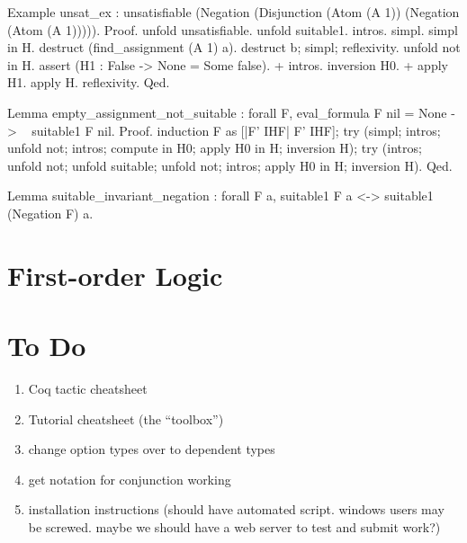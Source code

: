\documentclass{article}
\begin{document}
Example unsat_ex : unsatisfiable (Negation (Disjunction (Atom (A 1)) (Negation (Atom (A 1))))).
Proof.
  unfold unsatisfiable.
  unfold suitable1.
  intros.
  simpl. simpl in H.
  destruct (find_assignment (A 1) a).
  destruct b; simpl; reflexivity.
  unfold not in H.
  assert (H1 : False -> None = Some false).
  + intros. inversion H0.
  + apply H1. apply H. reflexivity.
Qed.

Lemma empty_assignment_not_suitable : forall F,
                                        eval_formula F nil = None -> ~ suitable1 F nil.
Proof.
  induction F as [|F' IHF| F' IHF];
  try (simpl; intros; unfold not; intros; compute in H0; apply H0 in H; inversion H);
  try (intros; unfold not; unfold suitable; unfold not; intros; apply H0 in H; inversion H).
Qed.

Lemma  suitable_invariant_negation : forall F a,                                                                                                                                                            
                                       suitable1 F a <-> suitable1 (Negation F) a.


\section{First-order Logic}





\section{To Do}
\begin{enumerate}
\item Coq tactic cheatsheet
\item Tutorial cheatsheet (the ``toolbox'')
\item change option types over to dependent types
\item get notation for conjunction working
\item installation instructions (should have automated script. windows users may be screwed. maybe we should have a web server to test and submit work?)
\end{enumerate}





\end{document}
